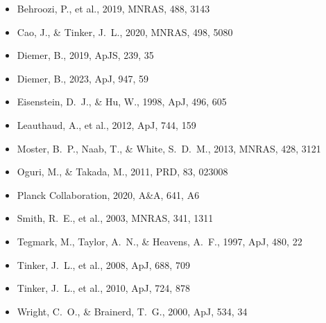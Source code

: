 \documentclass[12pt, letterpaper]{article}
\begin{document}
\begin{itemize}
\item Behroozi, P., et al., 2019, MNRAS, 488, 3143
\item Cao, J., \& Tinker, J.~L., 2020, MNRAS, 498, 5080
\item Diemer, B., 2019, ApJS, 239, 35
\item Diemer, B., 2023, ApJ, 947, 59
\item Eisenstein, D.~J., \& Hu, W., 1998, ApJ, 496, 605
\item Leauthaud, A., et al., 2012, ApJ, 744, 159
\item Moster, B.~P., Naab, T., \& White, S.~D.~M., 2013, MNRAS, 428, 3121
\item Oguri, M., \& Takada, M., 2011, PRD, 83, 023008
\item Planck Collaboration, 2020, A\&A, 641, A6
\item Smith, R.~E., et al., 2003, MNRAS, 341, 1311
\item Tegmark, M., Taylor, A.~N., \& Heavens, A.~F., 1997, ApJ, 480, 22
\item Tinker, J.~L., et al., 2008, ApJ, 688, 709
\item Tinker, J.~L., et al., 2010, ApJ, 724, 878
\item Wright, C.~O., \& Brainerd, T.~G., 2000, ApJ, 534, 34
\end{itemize}
\end{document}
